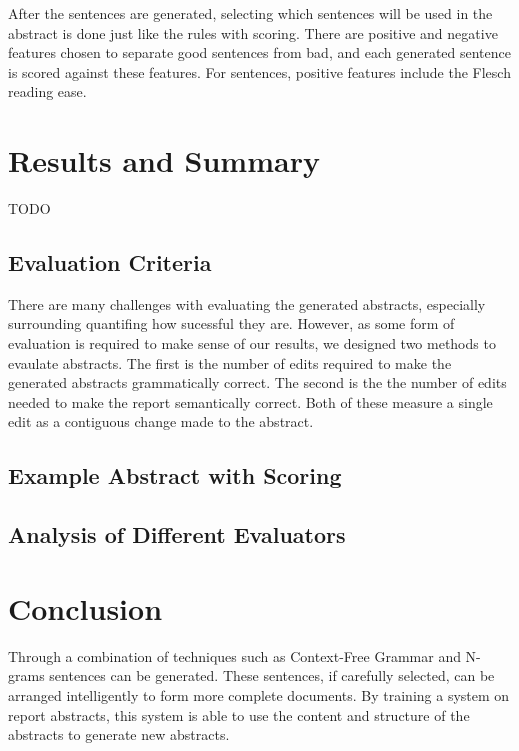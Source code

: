 \documentclass[letterpaper, 10 pt, conference]{ieeeconf}  %
\begin{document}
After the sentences are generated, selecting which sentences will be used in the abstract is done just like the rules with scoring. There are positive and negative features chosen to separate good sentences from bad, and each generated sentence is scored against these features. For sentences, positive features include the Flesch reading ease. 

\section{Results and Summary}

TODO

\subsection{Evaluation Criteria}

There are many challenges with evaluating the generated abstracts, especially surrounding quantifing how sucessful they are. However, as some form of evaluation is required to make sense of our results, we designed two methods to evaulate abstracts. The first is the number of edits required to make the generated abstracts grammatically correct. The second is the the number of edits needed to make the report semantically correct. Both of these measure a single edit as a contiguous change made to the abstract.

\subsection{Example Abstract with Scoring}

\subsection{Analysis of Different Evaluators}

\section{Conclusion}

Through a combination of techniques such as Context-Free Grammar and N-grams sentences can be generated. These sentences, if carefully selected, can be arranged intelligently to form more complete documents. By training a system on report abstracts, this system is able to use the content and structure of the abstracts to generate new abstracts.

\addtolength{\textheight}{-12cm}   %
\end{document}
